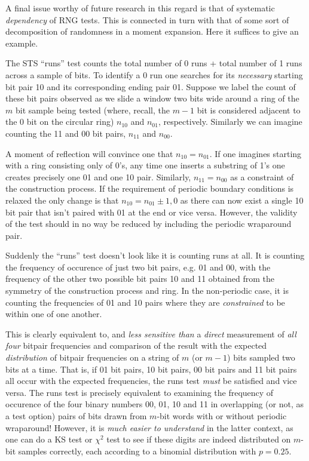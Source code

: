 \documentclass[12pt]{article}
\begin{document}
A final issue worthy of future research in this regard is that of
systematic {\em dependency} of RNG tests.  This is connected in turn
with that of some sort of decomposition of randomness in a moment
expansion.  Here it suffices to give an example.  

The STS ``runs'' test counts the total number of 0 runs + total number
of 1 runs across a sample of bits.  To identify a 0 run one searches for
its {\em necessary} starting bit pair 10 and its corresponding ending
pair 01.  Suppose we label the count of these bit pairs observed as we
slide a window two bits wide around a ring of the $m$ bit sample being
tested (where, recall, the $m-1$ bit is considered adjacent to the $0$
bit on the circular ring) $n_{10}$ and $n_{01}$, respectively.  Similarly
we can imagine counting the 11 and 00 bit pairs, $n_{11}$ and $n_{00}$.

A moment of reflection will convince one that $n_{10} = n_{01}$.  If one
imagines starting with a ring consisting only of 0's, any time one
inserts a substring of 1's one creates precisely one 01 and one 10 pair.
Similarly, $n_{11} = n_{00}$ as a constraint of the construction
process.  If the requirement of periodic boundary conditions is relaxed
the only change is that $n_{10} = n_{01} \pm 1,0$ as there can now exist
a single 10 bit pair that isn't paired with 01 at the end or vice versa.
However, the validity of the test should in no way be reduced by
including the periodic wraparound pair.

Suddenly the ``runs'' test doesn't look like it is counting runs at all.
It is counting the frequency of occurence of just two bit pairs, e.g. 01
and 00, with the frequency of the other two possible bit pairs 10 and 11
obtained from the symmetry of the construction process and ring.  In the
non-periodic case, it is counting the frequencies of 01 and 10 pairs
where they are {\em constrained} to be within one of one another.

This is clearly equivalent to, and {\em less sensitive than} a {\em
direct} measurement of {\em all four} bitpair frequencies and comparison
of the result with the expected {\em distribution} of bitpair
frequencies on a string of $m$ (or $m-1$) bits sampled two bits at a
time.  That is, if 01 bit pairs, 10 bit pairs, 00 bit pairs and 11 bit
pairs all occur with the expected frequencies, the runs test {\em must}
be satisfied and vice versa.  The runs test is precisely equivalent to
examining the frequency of occurence of the four binary numbers 00, 01,
10 and 11 in overlapping (or not, as a test option) pairs of bits drawn
from $m$-bit words with or without periodic wraparound!  However, it is
{\em much easier to understand} in the latter context, as one can do a
KS test or $\chi^2$ test to see if these digits are indeed distributed
on $m$-bit samples correctly, each according to a binomial distribution
with $p = 0.25$.
\end{document}
